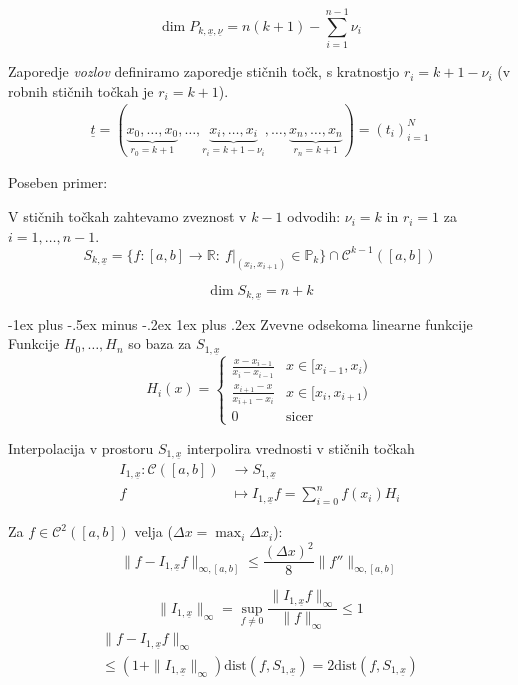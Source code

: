 \documentclass[a3paper,9pt]{extarticle}
\makeatletter
\renewcommand{\subsubsection}{\@startsection{subsubsection}{3}{0mm}%
                                {-1ex plus -.5ex minus -.2ex}%
                                {1ex plus .2ex}%
                                {\normalfont\small\bfseries}}
\makeatother
\begin{document}
\begin{multicols}{5}
\[ \dim P_{k, \underline{x}, \underline{\nu}} = n(k+1) - \sum_{i=1}^{n-1} \nu_i \]

Zaporedje \textit{vozlov} definiramo zaporedje stičnih točk, s kratnostjo $r_i = k + 1 - \nu_i$ (v robnih stičnih točkah je $r_i = k+1$).
\begin{gather*}
	\underline{t} = ({\scriptstyle \underbrace{ x_0,\dots,x_0}_{r_0 = k + 1}, \dots, \underbrace{x_i, \dots, x_i}_{r_i = k + 1 - \nu_i}, \dots, \underbrace{x_n,\dots,x_n}_{r_n = k+1}}) = (t_i)_{i=1}^N
\end{gather*}

Poseben primer:

V stičnih točkah zahtevamo zveznost v $k-1$ odvodih: $\nu_i = k$ in $r_i = 1$ za $i = 1, \dots, n-1$. 
\[ S_{k, \underline{x}} = \Big\{ f: [a,b] \to \mathbb{R} :\ f|_{(x_i, x_{i+1})} \in \mathbb{P}_k \Big\} \cap \mathcal{C}^{k-1}([a,b])\]

\[ \dim S_{k, \underline{x}}  = n + k\]

\subsubsection{Zvevne odsekoma linearne funkcije}
Funkcije $H_0, \dots, H_n$ so baza za $S_{1,\underline{x}}$
\[
	H_i(x) = \begin{cases}
		\frac{x-x_{i-1}}{x_i - x_{i-1}} & x \in [x_{i-1}, x_i) \\
		\frac{x_{i+1}-x}{x_{i+1} - x_i} & x \in [x_i, x_{i+1}) \\
		0 & \text{sicer}
	\end{cases}
\]

Interpolacija v prostoru $S_{1, \underline{x}}$ interpolira vrednosti v stičnih točkah
\begin{align*}
	I_{1, \underline{x}} : \mathcal{C}([a,b]) &\to S_{1, \underline{x}} \\
	f & \mapsto I_{1, \underline{x}} f = \sum_{i=0}^n f(x_i) H_i
\end{align*}

Za $f \in \mathcal{C}^2([a,b])$ velja ($\Delta x = \max_i \Delta x_i$):
\[ \| f - I_{1,\underline{x}} f \|_{\infty, [a,b]} \leq \frac{(\Delta x)^2}{8} \| f''\|_{\infty, [a,b]}\]

\[ \| I_{1, \underline{x}} \|_\infty = \sup_{f \neq 0} \frac{\| I_{1, \underline{x}} f \|_\infty}{\| f \|_\infty} \leq 1 \]
\begin{multline*}
	\| f - I_{1,\underline{x}} f \|_{\infty} \\ \leq (1 + \| I_{1, \underline{x}} \|_\infty) \text{dist}(f, S_{1, \underline{x}}) = 2\text{dist}(f, S_{1, \underline{x}})
\end{multline*}


\end{multicols}
\end{document}
